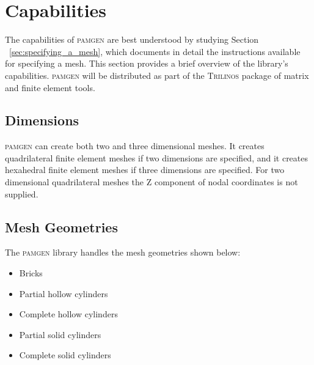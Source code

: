 

\clearpage
\section{Capabilities}\label{sec:caps}
The capabilities of \textsc{pamgen} are best understood by studying Section ~\ref{sec:specifying_a_mesh}, which documents in detail the instructions available for specifying a mesh. This section provides a brief overview of the library's capabilities. \textsc{pamgen} will be distributed as part of the \textsc{Trilinos} package of matrix and finite element tools.

\subsection{Dimensions}
\textsc{pamgen} can create both two and three dimensional meshes. It creates quadrilateral finite element meshes if two dimensions are specified, and it creates hexahedral finite element meshes if three dimensions are specified. For two dimensional quadrilateral meshes the Z component of nodal coordinates is not supplied.

\subsection{Mesh Geometries}

The \textsc{pamgen} library handles the mesh geometries shown below:
\begin{itemize}\addtolength{\itemsep}{-0.5\baselineskip}
\item Bricks
\item Partial hollow cylinders
\item Complete hollow cylinders
\item Partial solid cylinders
\item Complete solid cylinders
\end{itemize}


